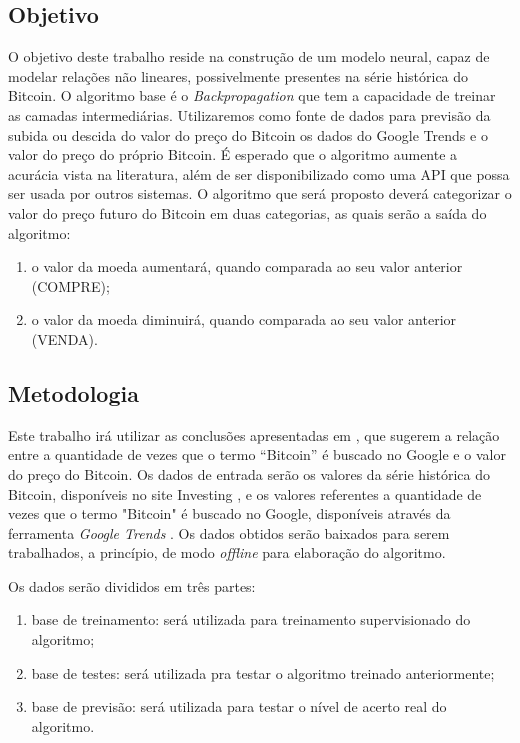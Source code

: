 \subsection{Objetivo}
O objetivo deste trabalho reside na construção de um modelo neural, capaz de modelar relações não lineares, possivelmente presentes na série histórica do Bitcoin. O algoritmo base é o \emph{Backpropagation} \cite{hecht1992theory} que tem a capacidade de treinar as camadas intermediárias. Utilizaremos como fonte de dados para previsão da subida ou descida do valor do preço do Bitcoin os dados do Google Trends e o valor do preço do próprio Bitcoin. É esperado que o algoritmo aumente a acurácia vista na literatura, além de ser disponibilizado como uma API que possa ser usada por outros sistemas. O algoritmo que será proposto deverá categorizar o valor do preço futuro do Bitcoin em duas categorias, as quais serão a saída do algoritmo:
\begin{enumerate}
\item o valor da moeda aumentará, quando comparada ao seu valor anterior (COMPRE);
\item o valor da moeda diminuirá, quando comparada ao seu valor anterior (VENDA).
\end{enumerate}

\subsection{Metodologia}

Este trabalho irá utilizar as conclusões apresentadas em  \cite{matta2015bitcoin, mcnally2016predicting,weigend2018time}, que sugerem a relação entre a quantidade de vezes que o termo ``Bitcoin'' é buscado no Google e o valor do preço do Bitcoin. Os dados de entrada serão os valores da série histórica do Bitcoin, disponíveis no site Investing \cite{Investing}, e os valores referentes a quantidade de vezes que o termo "Bitcoin" é buscado no Google, disponíveis através da ferramenta \textit{Google Trends} \cite{GoogleTrends}. Os dados obtidos serão baixados para serem trabalhados, a princípio, de modo \textit{offline} para elaboração do algoritmo.

Os dados serão divididos em três partes:
\begin{enumerate}
\item base de treinamento: será utilizada para treinamento supervisionado do algoritmo;
\item base de testes: será utilizada pra testar o algoritmo treinado anteriormente;
\item base de previsão: será utilizada para testar o nível de acerto real do algoritmo.
\end{enumerate}

